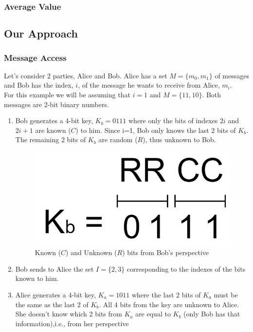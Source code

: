 \begin{refsection}
\subsubsection{Average Value}

\subsection{Our Approach}
\subsubsection{Message Access}
Let's consider 2 parties, Alice and Bob. Alice has a set $M = \{m_0,m_1\}$ of messages and Bob has the index, $i$, of the message he wants to receive from Alice, $m_i$.\\
For this example we will be assuming that $i=1$ and $M = \{11,10\}$. Both messages are 2-bit binary numbers.
\begin{enumerate}
\item Bob generates a 4-bit key, $K_b=0111$ where only the bits of indexes $2i$ and $2i+1$ are known ($C$) to him. Since i=1, Bob only knows the last 2 bits of $K_b$. The remaining 2 bits of $K_b$ are random ($R$), thus unknown to Bob.
\renewcommand{\figurename}{Figure}
\begin{figure}[H]
\centering
\includegraphics[width=.25\linewidth]{./sdf/classical_mpc/figures/mpc_bob_key}
\caption{Known ($C$) and Unknown ($R$) bits from Bob's perspective }
\label{fig:knownbob}
\end{figure}
\item Bob sends to Alice the set $I = \{2,3\}$ corresponding to the indexes of the bits known to him.
\item Alice generates a 4-bit key, $K_a=1011$ where the last 2 bits of $K_a$ must be the same as the last 2 of $K_b$. All 4 bits from the key
are unknown to Alice. She doesn't know which 2 bits from $K_a$ are equal to $K_b$ (only Bob has that information),i.e., from her perspective

\end{enumerate}
\end{refsection}
